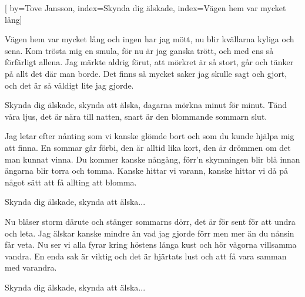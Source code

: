 


[ 	%
	by={Tove Jansson},
	index={Skynda dig älskade},
	index={Vägen hem var mycket lång}]		%
	
\beginverse*		%
Vägen hem var mycket lång och ingen har jag mött,
nu blir kvällarna kyliga och sena.
Kom trösta mig en smula, för nu är jag ganska trött,
och med ens så förfärligt allena.
Jag märkte aldrig förut, att mörkret är så stort,
går och tänker på allt det där man borde.
Det finns så mycket saker jag skulle sagt och gjort,
och det är så väldigt lite jag gjorde.
\endverse			%

\beginchorus
Skynda dig älskade, skynda att älska,
dagarna mörkna minut för minut.
Tänd våra ljus, det är nära till natten,
snart är den blommande sommarn slut.
\endchorus

\beginverse*		%
Jag letar efter nånting som vi kanske glömde bort
och som du kunde hjälpa mig att finna.
En sommar går förbi, den är alltid lika kort,
den är drömmen om det man kunnat vinna.
Du kommer kanske nångång, förr'n skymningen blir blå
innan ängarna blir torra och tomma.
Kanske hittar vi varann, kanske hittar vi då på
något sätt att få allting att blomma.
\endverse			%

\beginchorus
Skynda dig älskade, skynda att älska...
\endchorus

\newpage
\beginverse*		%
Nu blåser storm därute och stänger sommarns dörr,
det är för sent för att undra och leta.
Jag älskar kanske mindre än vad jag gjorde förr
men mer än du nånsin får veta.
Nu ser vi alla fyrar kring höstens långa kust
och hör vågorna villsamma vandra.
En enda sak är viktig och det är hjärtats lust
och att få vara samman med varandra.
\endverse			%

\beginchorus
Skynda dig älskade, skynda att älska...
\endchorus
\endsong			%
